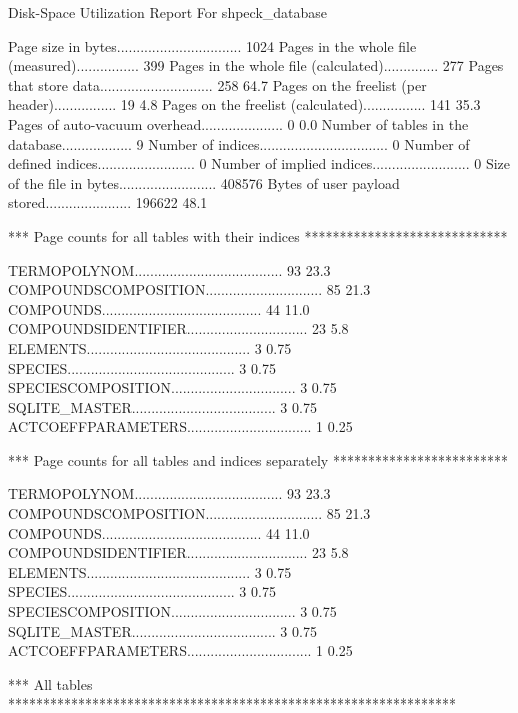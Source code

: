Disk-Space Utilization Report For shpeck_database

Page size in bytes................................ 1024      
Pages in the whole file (measured)................ 399       
Pages in the whole file (calculated).............. 277       
Pages that store data............................. 258         64.7%
Pages on the freelist (per header)................ 19           4.8%
Pages on the freelist (calculated)................ 141         35.3%
Pages of auto-vacuum overhead..................... 0            0.0%
Number of tables in the database.................. 9         
Number of indices................................. 0         
Number of defined indices......................... 0         
Number of implied indices......................... 0         
Size of the file in bytes......................... 408576    
Bytes of user payload stored...................... 196622      48.1%

*** Page counts for all tables with their indices *****************************

TERMOPOLYNOM...................................... 93          23.3%
COMPOUNDSCOMPOSITION.............................. 85          21.3%
COMPOUNDS......................................... 44          11.0%
COMPOUNDSIDENTIFIER............................... 23           5.8%
ELEMENTS.......................................... 3            0.75%
SPECIES........................................... 3            0.75%
SPECIESCOMPOSITION................................ 3            0.75%
SQLITE_MASTER..................................... 3            0.75%
ACTCOEFFPARAMETERS................................ 1            0.25%

*** Page counts for all tables and indices separately *************************

TERMOPOLYNOM...................................... 93          23.3%
COMPOUNDSCOMPOSITION.............................. 85          21.3%
COMPOUNDS......................................... 44          11.0%
COMPOUNDSIDENTIFIER............................... 23           5.8%
ELEMENTS.......................................... 3            0.75%
SPECIES........................................... 3            0.75%
SPECIESCOMPOSITION................................ 3            0.75%
SQLITE_MASTER..................................... 3            0.75%
ACTCOEFFPARAMETERS................................ 1            0.25%

*** All tables ****************************************************************

